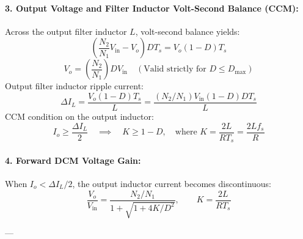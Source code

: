 \paragraph{3. Output Voltage and Filter Inductor Volt-Second Balance (CCM):}
Across the output filter inductor $L$, volt-second balance yields:
\[
\left(\frac{N_2}{N_1} V_{\mathrm{in}} - V_o\right) D T_s = V_o (1-D) T_s
\]
\begin{equation}
V_o = \left(\frac{N_2}{N_1}\right) D V_{\mathrm{in}} \quad (\text{Valid strictly for } D \le D_{\max})
\end{equation}
Output filter inductor ripple current:
\begin{equation}
\Delta I_L = \frac{V_o (1-D) T_s}{L} = \frac{(N_2/N_1) V_{\mathrm{in}} (1-D) D T_s}{L}
\end{equation}
CCM condition on the output inductor:
\begin{equation}
I_o \ge \frac{\Delta I_L}{2} \quad\implies\quad K \ge 1 - D, \quad \text{where } K = \frac{2 L}{R T_s} = \frac{2 L f_s}{R}
\end{equation}

\paragraph{4. Forward DCM Voltage Gain:}
When $I_o < \Delta I_L / 2$, the output inductor current becomes discontinuous:
\begin{equation}
\frac{V_o}{V_{\mathrm{in}}} = \frac{N_2/N_1}{1 + \sqrt{1 + 4K / D^2}}, \qquad K = \frac{2 L}{R T_s}
\end{equation}

---

